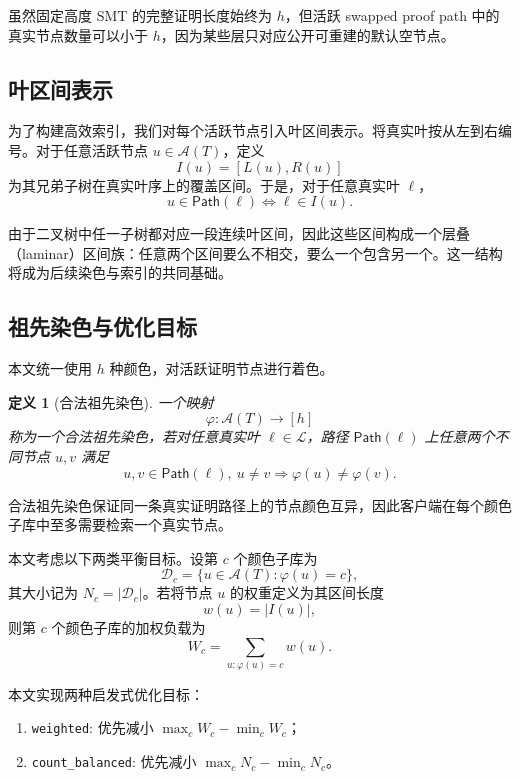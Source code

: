 \documentclass[UTF8]{ctexart}
\newtheorem{definition}{定义}[section]
\begin{document}
	虽然固定高度 SMT 的完整证明长度始终为 $h$，但活跃 swapped proof path 中的真实节点数量可以小于 $h$，因为某些层只对应公开可重建的默认空节点。
	
	\subsection{叶区间表示}
	
	为了构建高效索引，我们对每个活跃节点引入叶区间表示。将真实叶按从左到右编号。对于任意活跃节点 $u \in \mathcal{A}(T)$，定义
	\[
	I(u) = [L(u),R(u)]
	\]
	为其兄弟子树在真实叶序上的覆盖区间。于是，对于任意真实叶 $\ell$，
	\[
	u \in \mathsf{Path}(\ell) \Longleftrightarrow \ell \in I(u).
	\]
	
	由于二叉树中任一子树都对应一段连续叶区间，因此这些区间构成一个层叠（laminar）区间族：任意两个区间要么不相交，要么一个包含另一个。这一结构将成为后续染色与索引的共同基础。
	
	\subsection{祖先染色与优化目标}
	
	本文统一使用 $h$ 种颜色，对活跃证明节点进行着色。
	
	\begin{definition}[合法祖先染色]
		一个映射
		\[
		\varphi:\mathcal{A}(T)\rightarrow[h]
		\]
		称为一个合法祖先染色，若对任意真实叶 $\ell \in \mathcal{L}$，路径 $\mathsf{Path}(\ell)$ 上任意两个不同节点 $u,v$ 满足
		\[
		u,v\in \mathsf{Path}(\ell),\ u\neq v \Longrightarrow \varphi(u)\neq \varphi(v).
		\]
	\end{definition}
	
	合法祖先染色保证同一条真实证明路径上的节点颜色互异，因此客户端在每个颜色子库中至多需要检索一个真实节点。
	
	本文考虑以下两类平衡目标。设第 $c$ 个颜色子库为
	\[
	\mathcal{D}_c = \{u\in\mathcal{A}(T): \varphi(u)=c\},
	\]
	其大小记为 $N_c = |\mathcal{D}_c|$。若将节点 $u$ 的权重定义为其区间长度
	\[
	w(u)=|I(u)|,
	\]
	则第 $c$ 个颜色子库的加权负载为
	\[
	W_c = \sum_{u:\varphi(u)=c} w(u).
	\]
	
	本文实现两种启发式优化目标：
	\begin{enumerate}[leftmargin=2em]
		\item \texttt{weighted}: 优先减小 $\max_c W_c - \min_c W_c$；
		\item \texttt{count\_balanced}: 优先减小 $\max_c N_c - \min_c N_c$。
	\end{enumerate}
	
\end{document}
